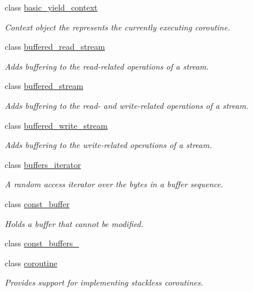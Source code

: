 \begin{DoxyCompactItemize}
class \hyperlink{classasio_1_1basic__yield__context}{basic\+\_\+yield\+\_\+context}
\begin{DoxyCompactList}\small\item\em Context object the represents the currently executing coroutine. \end{DoxyCompactList}\item 
class \hyperlink{classasio_1_1buffered__read__stream}{buffered\+\_\+read\+\_\+stream}
\begin{DoxyCompactList}\small\item\em Adds buffering to the read-\/related operations of a stream. \end{DoxyCompactList}\item 
class \hyperlink{classasio_1_1buffered__stream}{buffered\+\_\+stream}
\begin{DoxyCompactList}\small\item\em Adds buffering to the read-\/ and write-\/related operations of a stream. \end{DoxyCompactList}\item 
class \hyperlink{classasio_1_1buffered__write__stream}{buffered\+\_\+write\+\_\+stream}
\begin{DoxyCompactList}\small\item\em Adds buffering to the write-\/related operations of a stream. \end{DoxyCompactList}\item 
class \hyperlink{classasio_1_1buffers__iterator}{buffers\+\_\+iterator}
\begin{DoxyCompactList}\small\item\em A random access iterator over the bytes in a buffer sequence. \end{DoxyCompactList}\item 
class \hyperlink{classasio_1_1const__buffer}{const\+\_\+buffer}
\begin{DoxyCompactList}\small\item\em Holds a buffer that cannot be modified. \end{DoxyCompactList}\item 
class \hyperlink{classasio_1_1const__buffers__1}{const\+\_\+buffers\+\_}
\item 
class \hyperlink{classasio_1_1coroutine}{coroutine}
\begin{DoxyCompactList}\small\item\em Provides support for implementing stackless coroutines. \end{DoxyCompactList}\item 

\end{DoxyCompactItemize}
